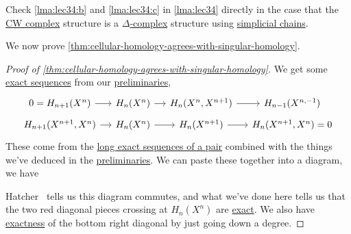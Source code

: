 \begin{exercise}
	Check \autoref{lma:lec34:b} and \autoref{lma:lec34:c} in \autoref{lma:lec34} directly in the case that the \hyperref[def:CW-Complex]{CW complex} structure is a \hyperref[def:delta-complex]{\(\Delta\)-complex} structure using \hyperref[def:simplicial-chain-group]{simplicial chains}.
\end{exercise}

We now prove \autoref{thm:cellular-homology-agrees-with-singular-homology}.

\begin{proof}[Proof of \autoref{thm:cellular-homology-agrees-with-singular-homology}]\label{pf:thm:cellular-homology-agrees-with-singular-homology}
	We get some \hyperref[def:exact-sequence]{exact sequences} from our \hyperref[lma:lec34]{preliminaries},
	\[
		\begin{tikzcd}[column sep=small,row sep=tiny]
			{0=H_{n+1}(X^n)} & {H_n(X^{n})} & {H_n(X^{n}, X^{n+1})} & {H_{n-1}(X^{n,-1})} \\
			{H_{n+1}(X^{n+1}, X^n)} & {H_n(X^n)} & {H_n(X^{n+1})} & {H_n(X^{n+1}, X^n)=0}
			\arrow[from=1-2, to=1-3]
			\arrow[from=1-3, to=1-4]
			\arrow[from=1-1, to=1-2]
			\arrow[from=2-1, to=2-2]
			\arrow[from=2-2, to=2-3]
			\arrow[from=2-3, to=2-4]
		\end{tikzcd}
	\]
	These come from the \hyperref[thm:long-exact-sequence-of-a-pair]{long exact sequences of a pair} combined with the things we've deduced in the \hyperref[lma:lec34]{preliminaries}. We can paste these together into a diagram, we have

	Hatcher~\cite{hatcher2002algebraic} tells us this diagram commutes, and what we've done here tells us that the two red diagonal pieces crossing at \(H_n(X^n)\) are \hyperref[def:exact]{exact}. We also have \hyperref[def:exact]{exactness} of the bottom right diagonal by just going down a degree.


\end{proof}
